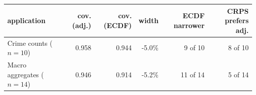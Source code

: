 \begin{tabular}{@{}lrrrrr@{}}
\toprule
application & cov. (adj.) & cov. (ECDF) & width & ECDF narrower & CRPS prefers adj. \\
\midrule
Crime counts ($n = 10$)    & 0.958 & 0.944 & -5.0\% & 9 of 10 & 8 of 10 \\
Macro aggregates ($n = 14$) & 0.946 & 0.914 & -5.2\% & 11 of 14 & 5 of 14 \\
\bottomrule
\end{tabular}

